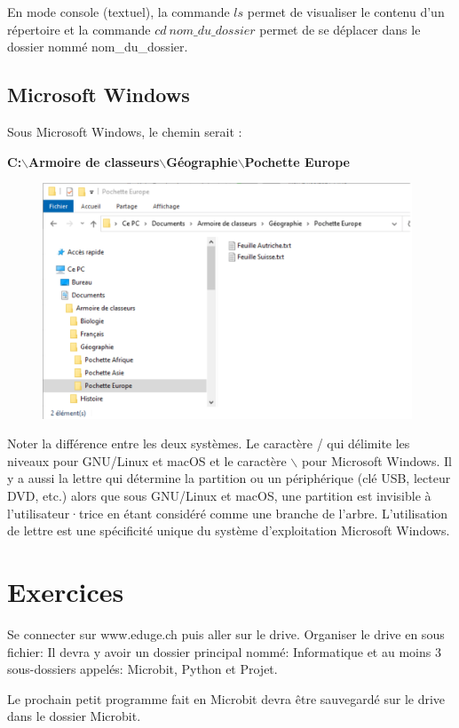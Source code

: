 \documentclass[11pt, a4paper]{book}
\begin{document}
En mode console (textuel), la commande $ls$ permet de visualiser le contenu d'un répertoire et la commande $cd\ nom\_du\_dossier$ permet de se déplacer dans le dossier nommé nom\_du\_dossier.

\subsection{Microsoft Windows}

Sous Microsoft Windows, le chemin serait :

\begin{center}
{\bf C:$\backslash$Armoire de classeurs$\backslash$Géographie$\backslash$Pochette Europe
}
\end{center}

\begin{figure}[ht!]
\centering
\includegraphics[width=11cm]{images/fichierWindows}
\end{figure}

Noter la différence entre les deux systèmes. Le caractère / qui délimite les niveaux pour GNU/Linux et macOS et le caractère $\backslash$ pour Microsoft Windows. Il y a aussi la lettre qui détermine la partition ou un périphérique (clé USB, lecteur DVD, etc.) alors que sous GNU/Linux et macOS, une partition est invisible à l’utilisateur·trice en étant considéré comme une branche de l’arbre. L'utilisation de lettre est une spécificité unique du système d'exploitation Microsoft Windows.

\section{Exercices}

\begin{exercice}
Se connecter sur www.eduge.ch puis aller sur le drive.
 Organiser le drive en sous fichier: Il devra y avoir un dossier principal nommé: Informatique et au moins 3 sous-dossiers appelés: Microbit, Python et Projet. 
 
 Le prochain petit programme fait en Microbit devra être sauvegardé sur le drive dans le dossier Microbit. 
\end{exercice}
\end{document}
